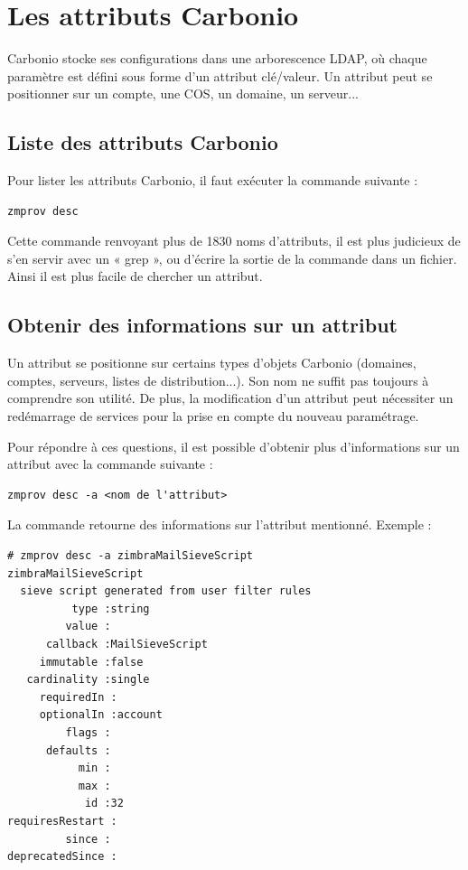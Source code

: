 \documentclass[11pt,a4paper]{report}
\begin{document}
\chapter{Les attributs Carbonio}

Carbonio stocke ses configurations dans une arborescence LDAP, où chaque paramètre est
défini sous forme d'un attribut clé/valeur.\allowbreak{} Un attribut peut se positionner sur un
compte, une COS, un domaine, un serveur.\allowbreak{}.\allowbreak{}.\allowbreak{}


\section{Liste des attributs Carbonio}
Pour lister les attributs Carbonio, il faut exécuter la commande suivante :

\begin{lstlisting}
zmprov desc
\end{lstlisting}
Cette commande renvoyant plus de 1830 noms d'attributs, il est plus judicieux de
s'en servir avec un « grep », ou d'écrire la sortie de la commande dans un fichier.\allowbreak{}
Ainsi il est plus facile de chercher un attribut.\allowbreak{}




\section{Obtenir des informations sur un attribut}
Un attribut se positionne sur certains types d'objets Carbonio (domaines, comptes,
serveurs, listes de distribution.\allowbreak{}.\allowbreak{}.\allowbreak{}).\allowbreak{} Son nom ne suffit pas toujours à comprendre
son utilité.\allowbreak{} De plus, la modification d'un attribut peut nécessiter un redémarrage
de services pour la prise en compte du nouveau paramétrage.\allowbreak{}

Pour répondre à ces questions, il est possible d'obtenir plus d'informations sur un
attribut avec la commande suivante :


\begin{lstlisting}
zmprov desc -a <nom de l'attribut>
\end{lstlisting}
La commande retourne des informations sur l'attribut mentionné.\allowbreak{} Exemple :

\begin{lstlisting}
# zmprov desc -a zimbraMailSieveScript
zimbraMailSieveScript
  sieve script generated from user filter rules
          type :string
         value :
      callback :MailSieveScript
     immutable :false
   cardinality :single
     requiredIn :
     optionalIn :account
         flags :
      defaults :
           min :
           max :
            id :32
requiresRestart :
         since :
deprecatedSince :

\end{lstlisting}
\end{document}
